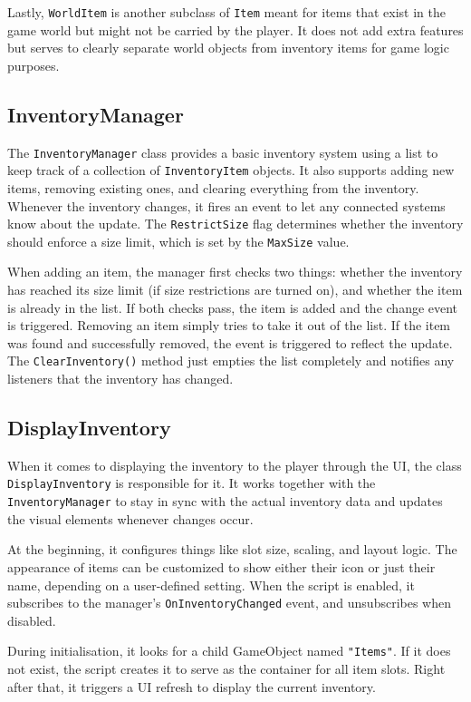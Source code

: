 Lastly, \verb|WorldItem| is another subclass of \verb|Item| meant for items that exist in the game world but might not be carried by the player. It does not add extra features but serves to clearly separate world objects from inventory items for game logic purposes.
 
\subsection{InventoryManager}
The \verb|InventoryManager| class provides a basic inventory system using a list to keep track of a collection of \verb|InventoryItem| objects. It also supports adding new items, removing existing ones, and clearing everything from the inventory. Whenever the inventory changes, it fires an event to let any connected systems know about the update. The \verb|RestrictSize| flag determines whether the inventory should enforce a size limit, which is set by the \verb|MaxSize| value.

When adding an item, the manager first checks two things: whether the inventory has reached its size limit (if size restrictions are turned on), and whether the item is already in the list. If both checks pass, the item is added and the change event is triggered. Removing an item simply tries to take it out of the list. If the item was found and successfully removed, the event is triggered to reflect the update. The \verb|ClearInventory()| method just empties the list completely and notifies any listeners that the inventory has changed.

\subsection{DisplayInventory}
When it comes to displaying the inventory to the player through the UI, the class \verb|DisplayInventory| is responsible for it. It works together with the \verb|InventoryManager| to stay in sync with the actual inventory data and updates the visual elements whenever changes occur.

At the beginning, it configures things like slot size, scaling, and layout logic. The appearance of items can be customized to show either their icon or just their name, depending on a user-defined setting. When the script is enabled, it subscribes to the manager’s \verb|OnInventoryChanged| event, and unsubscribes when disabled.

During initialisation, it looks for a child GameObject named \verb|"Items"|. If it does not exist, the script creates it to serve as the container for all item slots. Right after that, it triggers a UI refresh to display the current inventory.

